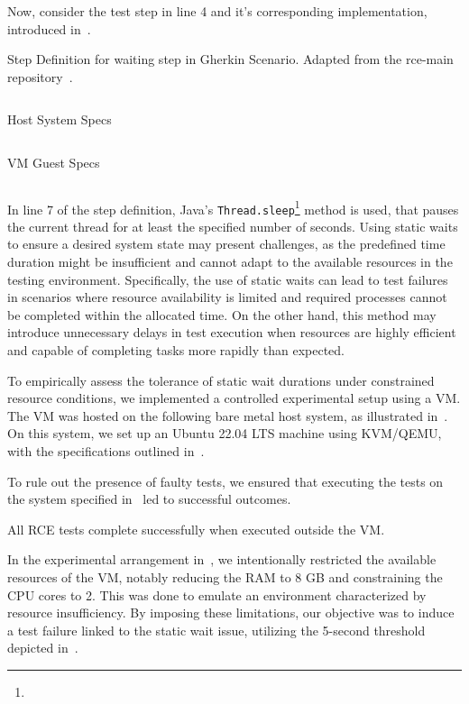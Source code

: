 Now, consider the test step in line 4 and it's corresponding implementation, introduced in~. 

\begin{listing}[!ht]
\caption{Step Definition for waiting step in Gherkin Scenario. Adapted from the rce-main repository~\cite{githubGitHubRcenvironmentrcemain}.}
\label{lst:staticwait_impl}
\inputminted[linenos, xleftmargin=2em]{java}{files/code/staticwait_impl.java}
\end{listing}

\begin{listing}[!ht]
\caption{Host System Specs}
\label{lst:host-specs}
\inputminted{text}{files/neofetch-host.txt}
\end{listing}

\begin{listing}[!ht]
\caption{\acl{VM} Guest Specs}
\label{lst:vm-specs}
\inputminted{text}{files/neofetch-test-host.txt}
\end{listing}

In line 7 of the step definition, Java's \texttt{Thread.sleep}\footnote{} method is used, that pauses the current thread for at least the specified number of seconds. Using static waits to ensure a desired system state may present challenges, as the predefined time duration might be insufficient and cannot adapt to the available resources in the testing environment. Specifically, the use of static waits can lead to test failures in scenarios where resource availability is limited and required processes cannot be completed within the allocated time. On the other hand, this method may introduce unnecessary delays in test execution when resources are highly efficient and capable of completing tasks more rapidly than expected.

To empirically assess the tolerance of static wait durations under constrained resource conditions, we implemented a controlled experimental setup using a \ac{VM}. The \ac{VM} was hosted on the following bare metal host system, as illustrated in~. On this system, we set up an Ubuntu 22.04 LTS machine using KVM/QEMU, with the specifications outlined in~.

To rule out the presence of faulty tests, we ensured that executing the tests on the system specified in~ led to successful outcomes. 
\begin{observation}
    All RCE tests complete successfully when executed outside the VM.
\end{observation}
In the experimental arrangement in~, we intentionally restricted the available resources of the \ac{VM}, notably reducing the RAM to 8 GB and constraining the CPU cores to 2. This was done to emulate an environment characterized by resource insufficiency. By imposing these limitations, our objective was to induce a test failure linked to the static wait issue, utilizing the 5-second threshold depicted in~. 

